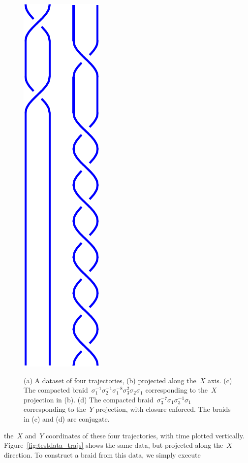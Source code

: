 \documentclass[12pt]{article}
\begin{document}
\begin{figure}
\begin{center}
{  \includegraphics[height=.3\textheight]{testdata_braidY}
  \label{fig:testdata_braidY}
}
\end{center}
\caption{(a) A dataset of four trajectories, (b) projected along the~$X$ axis.
  (c) The compacted braid~$ \sigma_1^{-1} \sigma_2^{-1}
  \sigma_1^{-8}\sigma_3^2\sigma_2\sigma_1$ corresponding to the~$X$ projection
  in (b).  (d) The compacted
  braid~$\sigma_3^{-7}\sigma_1\sigma_3^{-1}\sigma_1$ corresponding to the~$Y$
  projection, with closure enforced. %
  The braids in (c) and (d) are conjugate.}
\end{figure}
%
the~$X$ and~$Y$ coordinates of these four trajectories, with time
plotted vertically.  Figure~\ref{fig:testdata_trajs} shows the same
data, but projected along the~$X$ direction.  To construct a braid
from this data, we simply execute %
\end{document}

